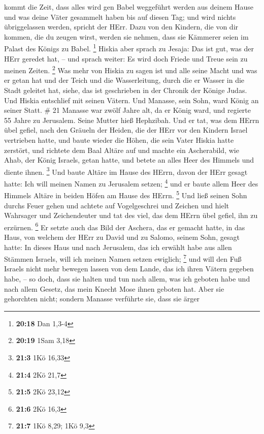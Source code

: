 kommt die Zeit, dass alles wird gen Babel weggeführt werden aus deinem
Hause und was deine Väter gesammelt haben bis auf diesen Tag; und wird
nichts übriggelassen werden, spricht der HErr.  Dazu von
den Kindern, die von dir kommen, die du zeugen wirst, werden sie nehmen,
dass sie Kämmerer seien im Palast des Königs zu Babel. \footnote{\textbf{20:18}
  Dan 1,3-4}  Hiskia aber sprach zu Jesaja: Das ist gut,
was der HErr geredet hat, -- und sprach weiter: Es wird doch Friede und
Treue sein zu meinen Zeiten. \footnote{\textbf{20:19} 1Sam 3,18}
 Was mehr von Hiskia zu sagen ist und alle seine Macht und
was er getan hat und der Teich und die Wasserleitung, durch die er
Wasser in die Stadt geleitet hat, siehe, das ist geschrieben in der
Chronik der Könige Judas.  Und Hiskia entschlief mit seinen
Vätern. Und Manasse, sein Sohn, ward König an seiner Statt. \# 21
 Manasse war zwölf Jahre alt, da er König ward, und regierte
55 Jahre zu Jerusalem. Seine Mutter hieß Hephzibah.  Und er
tat, was dem HErrn übel gefiel, nach den Gräueln der Heiden, die der
HErr vor den Kindern Israel vertrieben hatte,  und baute
wieder die Höhen, die sein Vater Hiskia hatte zerstört, und richtete dem
Baal Altäre auf und machte ein Ascherabild, wie Ahab, der König Israels,
getan hatte, und betete an alles Heer des Himmels und diente ihnen.
\footnote{\textbf{21:3} 1Kö 16,33}  Und baute Altäre im
Hause des HErrn, davon der HErr gesagt hatte: Ich will meinen Namen zu
Jerusalem setzen; \footnote{\textbf{21:4} 2Kö 21,7}  und er
baute allem Heer des Himmels Altäre in beiden Höfen am Hause des HErrn.
\footnote{\textbf{21:5} 2Kö 23,12}  Und ließ seinen Sohn
durchs Feuer gehen und achtete auf Vogelgeschrei und Zeichen und hielt
Wahrsager und Zeichendeuter und tat des viel, das dem HErrn übel gefiel,
ihn zu erzürnen. \footnote{\textbf{21:6} 2Kö 16,3}  Er
setzte auch das Bild der Aschera, das er gemacht hatte, in das Haus, von
welchem der HErr zu David und zu Salomo, seinem Sohn, gesagt hatte: In
dieses Haus und nach Jerusalem, das ich erwählt habe aus allen Stämmen
Israels, will ich meinen Namen setzen ewiglich; \footnote{\textbf{21:7}
  1Kö 8,29; 1Kö 9,3}  und will den Fuß Israels nicht mehr
bewegen lassen von dem Lande, das ich ihren Vätern gegeben habe, -- so
doch, dass sie halten und tun nach allem, was ich geboten habe und nach
allem Gesetz, das mein Knecht Mose ihnen geboten hat.  Aber
sie gehorchten nicht; sondern Manasse verführte sie, dass sie ärger
